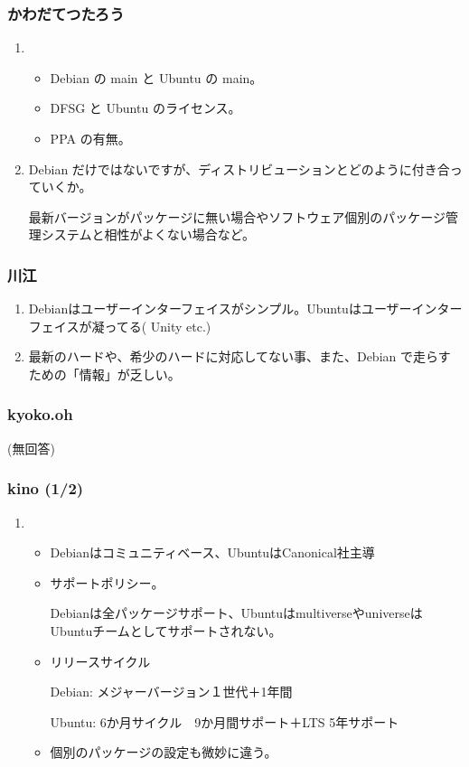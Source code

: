 \documentclass[cjk,dvipdfmx,10pt,compress,%
hyperref={bookmarks=true,bookmarksnumbered=true,bookmarksopen=false,%
colorlinks=false,%
pdftitle={第 72 回 関西 Debian 勉強会},%
pdfauthor={倉敷・のがた・佐々木・かわだ・八津尾},%
pdfsubject={資料},%
}]{beamer}
\begin{document}
\begin{frame}\frametitle{ かわだてつたろう }
  \begin{enumerate}
  \item
    \begin{itemize}
    \item Debian の main と Ubuntu の main。
    \item DFSG と Ubuntu のライセンス。
    \item PPA の有無。
    \end{itemize}
  \item Debian だけではないですが、ディストリビューションとどのように付き合っていくか。

    最新バージョンがパッケージに無い場合やソフトウェア個別のパッケージ管理システムと相性がよくない場合など。
  \end{enumerate}
\end{frame}

\begin{frame}\frametitle{ 川江 }
  \begin{enumerate}
  \item Debianはユーザーインターフェイスがシンプル。Ubuntuはユーザーインターフェイスが凝ってる( Unity etc.)
  \item 最新のハードや、希少のハードに対応してない事、また、Debian で走らすための「情報」が乏しい。
  \end{enumerate}
\end{frame}

\begin{frame}\frametitle{ kyoko.oh }

(無回答)

\end{frame}

\begin{frame}\frametitle{ kino (1/2)}
  \begin{enumerate}
  \item
    \begin{itemize}
    \item Debianはコミュニティベース、UbuntuはCanonical社主導
    \item サポートポリシー。

      Debianは全パッケージサポート、UbuntuはmultiverseやuniverseはUbuntuチームとしてサポートされない。

    \item リリースサイクル

      Debian: メジャーバージョン１世代＋1年間

      Ubuntu: 6か月サイクル　9か月間サポート＋LTS 5年サポート

    \item 個別のパッケージの設定も微妙に違う。
    \end{itemize}
  \end{enumerate}
\end{frame}
\end{document}
